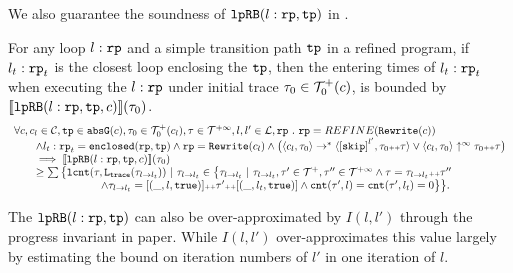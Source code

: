We also guarantee the soundness of $\mathtt{lpRB}(l: \mathtt{rp}, \mathtt{tp})$ in .
\begin{lem}
  \label{lem:looprb-sound}
  For any loop $l: \mathtt{rp}$ and a simple transition path $\mathtt{tp}$ in a refined program, if $l_t: \mathtt{rp}_t$ is the closest loop enclosing the $\mathtt{tp}$, then the entering times of $l_t: \mathtt{rp}_t$ when executing the $l: \mathtt{rp}$ under initial trace $\mathtt{\tau}_0 \in \mathcal{T}^{+}_0(c)$, is bounded by $\llbracket \mathtt{lpRB}(l: \mathtt{rp}, \mathtt{tp}, c) \rrbracket(\mathtt{\tau}_0)$.
  {\small
  \[
    \begin{array}{l}
    \forall c, c_l \in \cdom, \tpath \in \absG(c), \trace_0 \in \ftdom_0(c_l), \trace \in \tdom, l, l' \in \ldom, \rprog \st 
    \rprog = REFINE(\algrewrite(c))
    \\ \qquad
    \land l_t: \rprog_t = \kw{enclosed}(\rprog, \tpath)
    \land 
    \rprog = \algrewrite(c_l)
    \land
    \big(
    \config{c_l, \trace_0} \to^* \config{\clabel{\eskip}^{l'}, \trace_0 \tracecat \trace}
    \lor \config{c_l, \trace_0} \uparrow^{\infty} \trace_0 \tracecat \trace 
    \big)
    \\ \qquad
    \implies
    \econfig{\lpchB(l: \rprog, \tpath, c)}(\trace_0) 
    \\ \qquad \geq 
      \sum\big\{
      \lcounter(\trace, \tracel(\trace_{l \to l_t})) ~\vert~ \trace_{l \to l_t} \in 
      \big\{\trace_{l \to l_t} ~\vert~ 
      \trace_{l \to l_t}, \trace' \in \ftdom, \trace'' \in \tdom
      \land \trace = \trace_{l \to l_t} \tracecat \trace''
      \\ \qquad \qquad \qquad \qquad
      \land \trace_{l \to l_t} = [(\_, l, \etrue)] \tracecat \trace' \tracecat [(\_, l_t, \etrue)]
      \land \counter(\trace', l) = \counter(\trace', l_t) = 0 
      \big\}
      \big\}.
\end{array}
  \]
  }
\end{lem}
%

The $\mathtt{lpRB}(l:\mathtt{rp}, \mathtt{tp})$ 
can also be over-approximated by
$I(l, l')$ through the progress invariant in paper\cite{GulwaniJK09}.
While $I(l, l')$ over-approximates this value largely
by estimating the bound on iteration numbers of $l'$ in one iteration of $l$.

